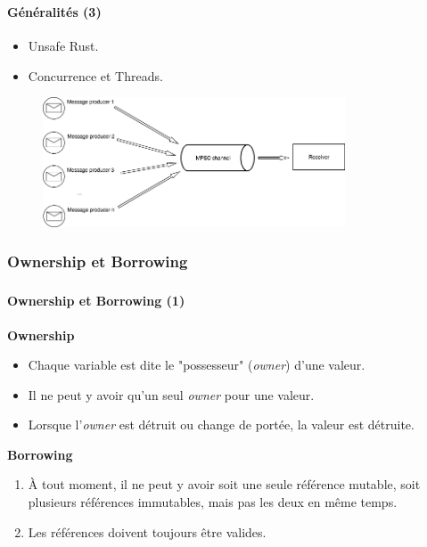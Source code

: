 \documentclass[10pt]{beamer}
\begin{document}
\begin{frame}
    \frametitle{\subsecname}
    \framesubtitle{Généralités (3)}
    \begin{itemize}
        \item Unsafe Rust.
        \item Concurrence et Threads.
    \end{itemize}
    \begin{center}
        \begin{figure}
            \includegraphics[width=0.8\textwidth]{images/mpsc.png}
        \end{figure}
    \end{center}
\end{frame}

\subsubsection{Ownership et Borrowing}
\begin{frame}
    \frametitle{\subsecname}
    \framesubtitle{Ownership et Borrowing (1)}
    \textbf{Ownership}
    \begin{itemize}
        \item Chaque variable est dite le "possesseur" (\textit{owner}) d'une valeur.
        \item Il ne peut y avoir qu'un seul \textit{owner} pour une valeur.
        \item Lorsque l'\textit{owner} est détruit ou change de portée, la valeur est détruite.
    \end{itemize}
    \bigbreak
    \textbf{Borrowing}
    \begin{enumerate}
        \item À tout moment, il ne peut y avoir soit une seule référence mutable, soit plusieurs 
            références immutables, mais pas les deux en même temps.
        \item Les références doivent toujours être valides.
    \end{enumerate}
\end{frame}
\end{document}
